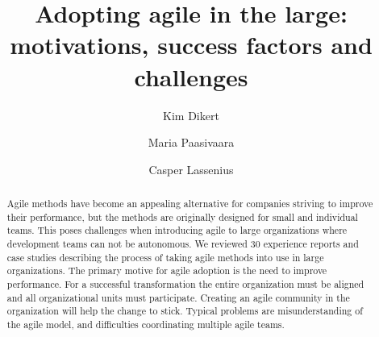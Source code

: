 \documentclass[preprint,authoryear,12pt]{elsarticle}
\begin{document}

\begin{frontmatter}



\title{Adopting agile in the large: motivations, success factors and challenges}

\author{Kim Dikert}

\author{Maria Paasivaara}

\author{Casper Lassenius}

\address{Aalto University, School of Science, Department of Computer Science and Engineering}



\begin{abstract}

Agile methods have become an appealing alternative for companies striving to
improve their performance, but the methods are originally designed for small and
individual teams. This poses challenges when introducing agile to large
organizations where development teams can not be autonomous. We reviewed 30
experience reports and case studies describing the process of taking agile
methods into use in large organizations. The primary motive for agile adoption
is the need to improve performance. For a successful transformation the entire
organization must be aligned and all organizational units must participate.
Creating an agile community in the organization will help the change to stick.
Typical problems are misunderstanding of the agile model, and difficulties
coordinating multiple agile teams.


\end{abstract}
\end{frontmatter}
\end{document}
